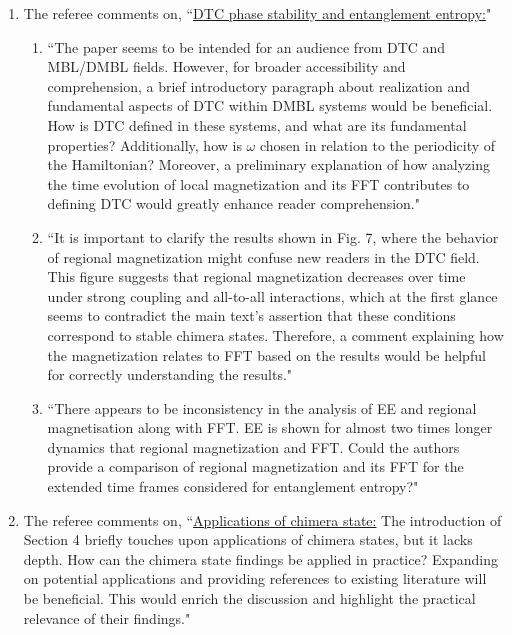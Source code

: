 \documentclass[aps,prb,reprint,showpacs,floatfix,superscriptaddress, onecolumn, nofootinbib, 10pt]{revtex4-2}
\newcommand{\response}[1]{{\color{black}#1}} %
\newcommand{\comment}[1]{{\color{blue}#1}} %
\begin{document}
\begin{enumerate}
\begin{enumerate}
		\item The referee comments on, \comment{``\underline{DTC phase stability and entanglement entropy:}"}
		\begin{enumerate}
			\item \comment{``The paper seems to be intended for an audience from DTC and MBL/DMBL fields. However, for broader accessibility and comprehension, a brief introductory paragraph about realization and fundamental aspects of DTC within DMBL
			systems would be beneficial. How is DTC defined in these systems, and what are its fundamental properties? Additionally, how is $\omega$ chosen in relation to the periodicity of the Hamiltonian? Moreover, a preliminary explanation of how analyzing the time evolution of local magnetization and its FFT contributes to defining DTC would greatly enhance reader comprehension."}\\
		
			\response{
			}
			\item \comment{``It is important to clarify the results shown in Fig. 7, where the behavior of regional magnetization might confuse new readers in the DTC field. This figure suggests that regional magnetization decreases over time under strong coupling and all-to-all interactions, which at the first glance seems to contradict the main text’s assertion that these conditions correspond to stable chimera states. Therefore, a comment  explaining how the magnetization relates to FFT based on the results would be helpful for correctly understanding the results."}
			\item \comment{``There appears to be inconsistency in the analysis of EE and regional magnetisation along with FFT. EE is shown for almost two times longer dynamics that regional magnetization and FFT. Could the authors provide a comparison of regional  magnetization and its FFT for the extended time frames considered for entanglement entropy?"}
		\end{enumerate}
		\item The referee comments on, \comment{``\underline{Applications of chimera state:} The introduction of Section 4 briefly touches upon applications of chimera states, but it lacks depth. How can the chimera state findings be applied in practice? Expanding on potential applications and providing references to existing literature will be beneficial. This would enrich the discussion and highlight the practical relevance of their findings."}
	\end{enumerate}


\end{enumerate}
\end{document}
